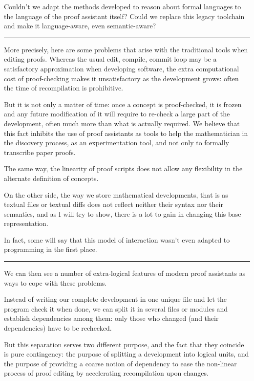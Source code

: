 \documentclass[12pt]{article}
\newcommand{\slide}{\vspace{1em} \hrule \vspace{1em}}
\begin{document}
Couldn't we adapt the methods developed to reason about formal
languages to the language of the proof assistant itself? Could we
replace this legacy toolchain and make it language-aware, even
semantic-aware?

\slide

More precisely, here are some problems that arise with the traditional
tools when editing proofs. Whereas the usual edit, compile, commit
loop may be a satisfactory approximation when developing software, the
extra computational cost of proof-checking makes it unsatisfactory as
the development grows: often the time of recompilation is prohibitive.

But it is not only a matter of time: once a concept is proof-checked,
it is frozen and any future modification of it will require to
re-check a large part of the development, often much more than what is
actually required. We believe that this fact inhibits the use of proof
assistants as tools to help the mathematician in the discovery
process, as an experimentation tool, and not only to formally
transcribe paper proofs.

The same way, the linearity of proof scripts does not allow any
flexibility in the alternate definition of concepts.

On the other side, the way we store mathematical developments, that is
as textual files or textual diffs does not reflect neither their
syntax nor their semantics, and as I will try to show, there is a lot
to gain in changing this base representation.

In fact, some will say that this model of interaction wasn't even
adapted to programming in the first place.

\slide


We can then see a number of extra-logical features of modern proof
assistants as ways to cope with these problems. 

Instead of writing our complete development in one unique file and let
the program check it when done, we can split it in several files or
modules and establish dependencies among them: only those who changed
(and their dependencies) have to be rechecked.

But this separation serves two different purpose, and the fact that
they coincide is pure contingency: the purpose of splitting a
development into logical units, and the purpose of providing a coarse
notion of dependency to ease the non-linear process of proof editing
by accelerating recompilation upon changes.
\end{document}
